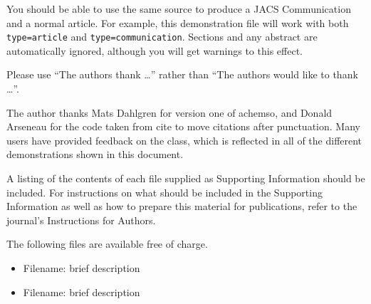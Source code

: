 \documentclass[journal=jacsat,manuscript=article]{achemso}
\begin{document}
You should be able to use the same source to produce a JACS
Communication and a normal article.  For example, this demonstration
file will work with both \texttt{type=article} and
\texttt{type=communication}. Sections and any abstract are
automatically ignored, although you will get warnings to this effect.

\begin{acknowledgement}

Please use ``The authors thank \ldots'' rather than ``The
authors would like to thank \ldots''.

The author thanks Mats Dahlgren for version one of \textsf{achemso},
and Donald Arseneau for the code taken from \textsf{cite} to move
citations after punctuation. Many users have provided feedback on the
class, which is reflected in all of the different demonstrations
shown in this document.

\end{acknowledgement}

\begin{suppinfo}

A listing of the contents of each file supplied as Supporting Information
should be included. For instructions on what should be included in the
Supporting Information as well as how to prepare this material for
publications, refer to the journal's Instructions for Authors.

The following files are available free of charge.
\begin{itemize}
  \item Filename: brief description
  \item Filename: brief description
\end{itemize}

\end{suppinfo}


\end{document}
